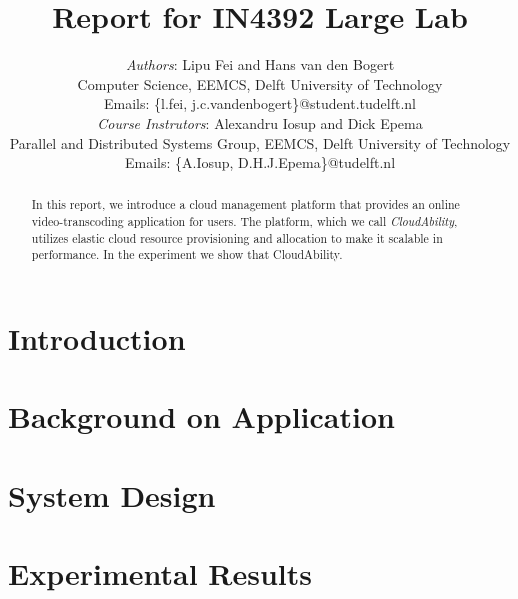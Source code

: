 \documentclass[10pt, a4paper, twoside, twocolumn, technote]{IEEEtran}
\begin{document}
\title{Report for IN4392 Large Lab}
\author{\textit{Authors}: Lipu Fei and Hans van den Bogert\\
  Computer Science, EEMCS, Delft University of Technology\\
  Emails: \{l.fei, j.c.vandenbogert\}@student.tudelft.nl\\
  \textit{Course Instrutors}: Alexandru Iosup and Dick Epema\\
  Parallel and Distributed Systems Group, EEMCS, Delft University of Technology\\
  Emails: \{A.Iosup, D.H.J.Epema\}@tudelft.nl}

\maketitle

\begin{abstract}
  In this report, we introduce a cloud management platform that
  provides an online video-transcoding application for users. The
  platform, which we call \emph{CloudAbility}, utilizes elastic cloud
  resource provisioning and allocation to make it scalable in
  performance. In the experiment we show that CloudAbility.
\end{abstract}

\section{Introduction}


\section{Background on Application}\label{background}


\section{System Design}\label{design}


\section{Experimental Results}\label{experiment}


\end{document}
